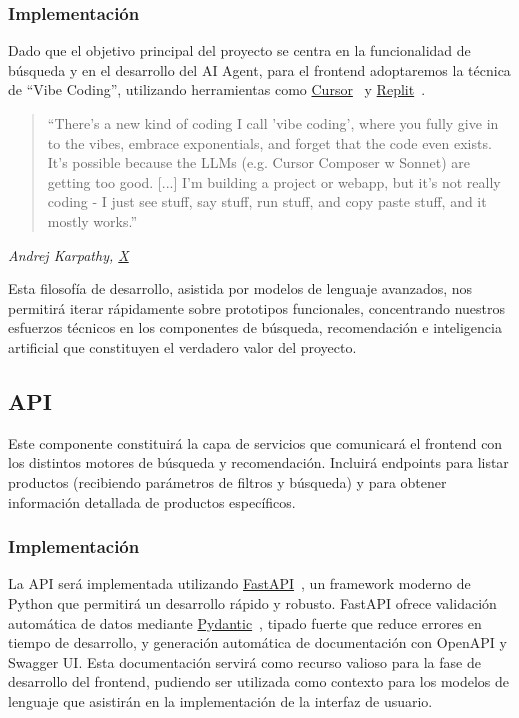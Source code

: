 \documentclass[12pt]{article}
\begin{document}
\subsubsection{Implementación}

Dado que el objetivo principal del proyecto se centra en la funcionalidad de búsqueda y en el desarrollo del AI Agent, para el frontend adoptaremos la técnica de ``Vibe Coding'', utilizando herramientas como \href{https://www.cursor.com}{Cursor}~\cite{Cursor} y \href{https://replit.com}{Replit}~\cite{Replit}.

\begin{quote}
    ``There's a new kind of coding I call 'vibe coding', where you fully give in to the vibes, embrace exponentials, and forget that the code even exists. It's possible because the LLMs (e.g. Cursor Composer w Sonnet) are getting too good. [...] I'm building a project or webapp, but it's not really coding - I just see stuff, say stuff, run stuff, and copy paste stuff, and it mostly works.''
\end{quote}

\textit{Andrej Karpathy, \href{https://x.com/karpathy/status/1886192184808149383}{X}}~\cite{Karpathy}

\vspace{0.5cm}

Esta filosofía de desarrollo, asistida por modelos de lenguaje avanzados, nos permitirá iterar rápidamente sobre prototipos funcionales, concentrando nuestros esfuerzos técnicos en los componentes de búsqueda, recomendación e inteligencia artificial que constituyen el verdadero valor del proyecto.

\subsection{API}

Este componente constituirá la capa de servicios que comunicará el frontend con los distintos motores de búsqueda y recomendación. Incluirá endpoints para listar productos (recibiendo parámetros de filtros y búsqueda) y para obtener información detallada de productos específicos.

\subsubsection{Implementación}

La API será implementada utilizando \href{https://fastapi.tiangolo.com/}{FastAPI}~\cite{FastAPI}, un framework moderno de Python que permitirá un desarrollo rápido y robusto. FastAPI ofrece validación automática de datos mediante \href{https://docs.pydantic.dev/latest/}{Pydantic}~\cite{Pydantic}, tipado fuerte que reduce errores en tiempo de desarrollo, y generación automática de documentación con OpenAPI y Swagger UI. Esta documentación servirá como recurso valioso para la fase de desarrollo del frontend, pudiendo ser utilizada como contexto para los modelos de lenguaje que asistirán en la implementación de la interfaz de usuario.
\end{document}
